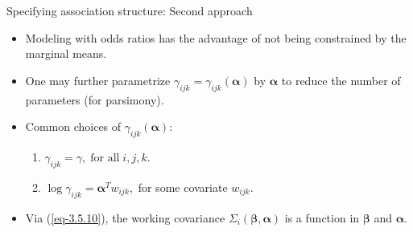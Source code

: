 \documentclass{beamer}
\newcommand{\boldbeta}{{\boldsymbol \beta}}
\newcommand{\boldalpha}{{\boldsymbol \alpha}}
\newenvironment{wideitemize}%
  {\begin{itemize}%
    \setlength{\parskip}{1em}}%
  {\end{itemize}}
\begin{document}
\begin{frame}{ \large Specifying association structure: Second approach}
\begin{wideitemize}

\item  Modeling with odds ratios has the advantage of not being constrained by the marginal means.

\item
One may further parametrize  $\gamma_{ijk}=
\gamma_{ijk}(\boldalpha)$ by $\boldalpha$ to reduce the number of parameters (for parsimony). 
\item
Common choices of $\gamma_{ijk}(\boldalpha)$:
\begin{enumerate}
\item
$\gamma_{ijk}=\gamma, \;\mbox{for all}\; i,j,k$.
\item
$
 \log\gamma_{ijk}=\boldalpha^Tw_{ijk},
 $
  for some covariate $w_{ijk}$.
\end{enumerate}
\item Via (\ref{eq-3.5.10}), the working covariance $\Sigma_i(\boldbeta, 
\boldalpha)$ is a function in $\boldbeta$ and $\boldalpha$.
\end{wideitemize}
\end{frame}
\end{document}
